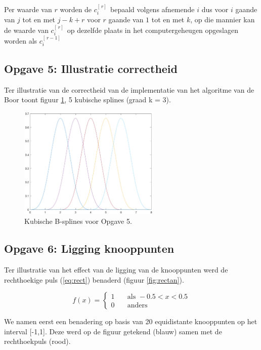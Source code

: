 \documentclass[a4paper]{article}
\newcommand{\opgave}[1]{\subsection{Opgave #1}}
\begin{document}
Per waarde van $r$ worden de $c_i^{[\, r]\, }$ bepaald volgens afnemende $i$ dus voor $i$ gaande van $j$ tot en met $j-k+r$ voor $r$ gaande van $1$ tot en met $k$, op die mannier kan de waarde van $c_i^{[\, r]\, }$ op dezelfde plaats in het computergeheugen opgeslagen worden als $c_i^{[\, r-1]\, }$




\opgave{5: Illustratie correctheid}\label{sec:oef5}
Ter illustratie van de correctheid van de implementatie van het algoritme van de Boor toont figuur \ref{fig:splines}, 5 kubische splines (graad k = 3).

\begin{figure}[H]
	\begin{center} 
		\includegraphics[width=0.6\textwidth]{BSplines.eps}
	\end{center}
	\caption{Kubische B-splines voor Opgave 5.}
	\label{fig:splines}
\end{figure}
\newpage

\opgave{6: Ligging knooppunten}\label{sec:oef6}
Ter illustratie van het effect van de ligging van de knooppunten werd de rechthoekige puls (\ref{eq:rect}) benaderd (figuur  \ref{fig:rectan}).

\begin{equation}
f(x) =
  \begin{cases}
    1       & \quad \text{als } -0.5 < x < 0.5\\
    0  & \quad \text{anders }
  \end{cases}
  \label{eq:rect}
\end{equation}

We namen eerst een benadering op basis van 20 equidistante knooppunten op het interval [-1,1]. Deze werd op de figuur getekend (blauw) samen met de rechthoekpuls (rood). \\
\end{document}
